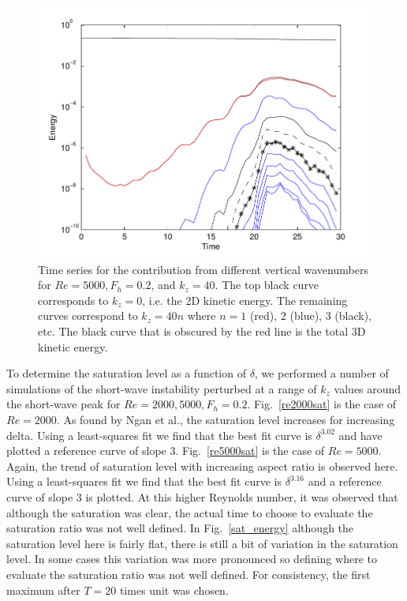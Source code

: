 \begin{figure}
\begin{center}
\includegraphics[width=\textwidth]{other_kz}
\caption{Time series for the contribution from different vertical wavenumbers for $Re=5000, F_{h}=0.2$, and $k_{z}=40$. The top black curve corresponds to $k_{z}=0$, i.e. the 2D kinetic energy. The remaining curves correspond to $k_{z} = 40n$ where $n=1$ (red), $2$ (blue), $3$ (black), etc. The black curve that is obscured by the red line is the total 3D kinetic energy.}
\label{other_kz}
\end{center}
\end{figure}

To determine the saturation level as a function of $\delta$, we performed a number of simulations of the short-wave instability perturbed at a range of $k_{z}$ values around the short-wave peak for $Re=2000,5000, F_{h}=0.2$. Fig.~\ref{re2000sat} is the case of $Re=2000$. As found by Ngan et al.\cite{ngan2005}, the saturation level increases for increasing delta. Using a least-squares fit we find that the best fit curve is $\delta^{3.02}$ and have plotted a reference curve of slope $3$. Fig.~\ref{re5000sat} is the case of $Re=5000$. Again, the trend of saturation level with increasing aspect ratio is observed here. Using a least-squares fit we find that the best fit curve is $\delta^{3.16}$ and a reference curve of slope $3$ is plotted. At this higher Reynolds number, it was observed that although the saturation was clear, the actual time to choose to evaluate the saturation ratio was not well defined. In Fig.~\ref{sat_energy} although the saturation level here is fairly flat, there is still a bit of variation in the saturation level. In some cases this variation was more pronounced so defining where to evaluate the saturation ratio was not well defined. For consistency, the first maximum after $T=20$ times unit was chosen. 

